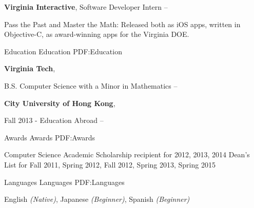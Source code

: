 \documentclass[letterpaper,MMMyyyy,nonstopmode]{simpleresumecv}
\begin{document}
\begin{Body}
\BigGap
\BigGap

\Entry
\begin{large}
{\textbf{Virginia Interactive}},
Software Developer Intern
\hfill
{} --

\Gap

\BulletItem
\begingroup %
Pass the Past and Master the Math: Released both as iOS apps, written in Objective-C, as award-winning apps for the Virginia DOE.
\end{large}


\BigGap
\Section
{Education}
{Education}
{PDF:Education}

\begin{large}
\Entry
{\textbf{Virginia Tech}},

\Gap
B.S. Computer Science with a Minor in Mathematics
\hfill
{} --

\BigGap
\Entry
{\textbf{City University of Hong Kong}},

\Gap
Fall 2013 - Education Abroad
\hfill
{} --
\end{large}


\BigGap
\Section
{Awards}
{Awards}
{PDF:Awards}

\begin{large}
Computer Science Academic Scholarship recipient for 2012, 2013, 2014
\Gap
Dean’s List for Fall 2011, Spring 2012, Fall 2012, Spring 2013, Spring 2015
\end{large}


\BigGap
\Section
{Languages}
{Languages}
{PDF:Languages}

\begin{large}
English
\textit{(Native)},
Japanese
\textit{(Beginner)},
Spanish
\textit{(Beginner)}
\end{large}

\end{Body}
\end{document}
